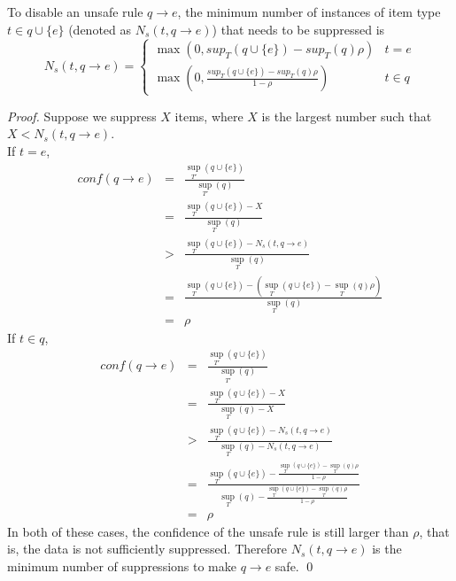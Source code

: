 \begin{lemma}
\label{minimum}
To disable an unsafe rule $q \rightarrow e$, the minimum number of instances
of item type $t \in q\cup\{e\}$ (denoted as $N_s(t, q\rightarrow e)$) 
that needs to be suppressed is
\begin{equation}\label{eq:N_s}N_s(t, q\rightarrow e)=
\begin{cases}
\max(0, sup_T(q\cup \{e\})-sup_T(q)\rho) & t=e  \\
\max(0, \frac{sup_T(q\cup \{e\})-sup_T(q)\rho}{1-\rho}) & t\in q %
\end{cases}
\end{equation}
\end{lemma}
\begin{proof}
Suppose we suppress $X$ items, where $X$ is the largest number such that
$X<N_s(t, q\rightarrow e)$.\\
If $t = e$,
\begin{eqnarray*}
conf(q \to e)&=&\frac{{{{\sup }_{T'}}(q \cup \{ e\} )}}{{{{\sup }_{T'}}(q)}}\\
&=&\frac{{{{\sup }_T}(q \cup \{ e\} ) - X}}{{{{\sup }_T}(q)}}\\
&>&\frac{{{{\sup }_T}(q \cup \{ e\} ) - {N_s}(t,q \to e)}}{{{{\sup }_T}(q)}}\\
&=&\frac{{{{\sup }_T}(q \cup \{ e\} ) - ({{\sup }_T}(q \cup \{ e\} ) - {{\sup }_T}(q)\rho )}}{{{{\sup }_T}(q)}}\\
&=&\rho
\end{eqnarray*}
If $t\in q$,
\begin{eqnarray*}
conf(q \to e)&=&\frac{{{{\sup }_{T'}}(q \cup \{ e\} )}}{{{{\sup }_{T'}}(q)}}\\
&=&\frac{{{{\sup }_T}(q \cup \{ e\} ) - X}}{{{{\sup }_T}(q) - X}}\\
&>&\frac{{{{\sup }_T}(q \cup \{ e\} ) - {N_s}(t,q \to e)}}{{{{\sup }_T}(q) - {N_s}(t,q \to e)}}\\
&=&\frac{{{{\sup }_T}(q \cup \{ e\} ) - \frac{{{{\sup }_T}(q \cup \{ e\} ) - {{\sup }_T}(q)\rho }}{{1 - \rho }}}}{{{{\sup }_T}(q) - \frac{{{{\sup }_T}(q \cup \{ e\} ) - {{\sup }_T}(q)\rho }}{{1 - \rho }}}}\\
&=& \rho
\end{eqnarray*}
In both of these cases, the confidence of the unsafe rule is still larger than $\rho$,
that is, the data is not sufficiently suppressed. Therefore $N_s(t, q\rightarrow e)$ is the 
minimum number of suppressions to make $q \rightarrow e$ safe.
\qed
\end{proof}

